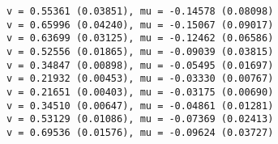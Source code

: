 \documentclass[11pt]{article}
\begin{document}
    \begin{Verbatim}[commandchars=\\\{\}]
v = 0.55361 (0.03851), mu = -0.14578 (0.08098)
v = 0.65996 (0.04240), mu = -0.15067 (0.09017)
v = 0.63699 (0.03125), mu = -0.12462 (0.06586)
v = 0.52556 (0.01865), mu = -0.09039 (0.03815)
v = 0.34847 (0.00898), mu = -0.05495 (0.01697)
v = 0.21932 (0.00453), mu = -0.03330 (0.00767)
v = 0.21651 (0.00403), mu = -0.03175 (0.00690)
v = 0.34510 (0.00647), mu = -0.04861 (0.01281)
v = 0.53129 (0.01086), mu = -0.07369 (0.02413)
v = 0.69536 (0.01576), mu = -0.09624 (0.03727)
    \end{Verbatim}

    \begin{center}
    \end{center}
    { \hspace*{\fill} \\}
    
    \begin{center}
    \end{center}
    { \hspace*{\fill} \\}
    
    \begin{center}
    \end{center}
    { \hspace*{\fill} \\}
    
    \begin{center}
    \end{center}
    { \hspace*{\fill} \\}
    
    \begin{center}
    \end{center}
    { \hspace*{\fill} \\}
    
    \begin{center}
    \end{center}
    { \hspace*{\fill} \\}
    
\end{document}
